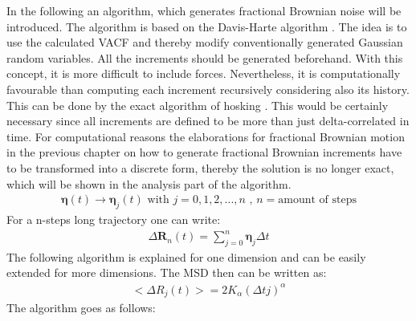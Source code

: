\documentclass[
  a4paper,BCOR10mm,oneside,
  bibtotoc,idxtotoc,
  headsepline,footsepline,%
  fleqn,openbib
]{scrbook}
\begin{document}
In the following an algorithm, which generates fractional Brownian noise will be introduced. The algorithm is based on the Davis-Harte algorithm \cite{Craigmile2003}. The idea is to use the calculated VACF and thereby modify conventionally generated Gaussian random variables. All the increments should be generated beforehand. With this concept, it is more difficult to include forces. Nevertheless, it is computationally favourable than computing each increment recursively considering also its history. This can be done by the exact algorithm of hosking \cite{WRCR:WRCR3676}. This would be certainly necessary since all increments are defined to be more than just delta-correlated in time. For computational reasons the elaborations for fractional Brownian motion in the previous chapter on how to generate fractional Brownian increments have to be transformed into a discrete form, thereby the solution is no longer exact, which will be shown in the analysis part of the algorithm.  
\begin{align}
\bm{\eta} (t) \longrightarrow \bm{\eta}_j(t)  \text{  with  } j=0,1,2,...,n  \text{  ,  } n= \text{amount of steps}
\end{align}
For a n-steps long trajectory one can write:
\begin{align}
 \Delta \bm{R}_n(t) =  \sum_{j=0}^n \bm{\eta}_j  \Delta t \label{eq:diskretdeltar}
\end{align}
 The following algorithm is explained for one dimension and can be easily extended for more dimensions. The MSD then can be written as:
\begin{align}
< \Delta R_{j}(t)>=2K_{\alpha} (\Delta t j)^{\alpha}
\end{align}
The algorithm goes as follows:
\end{document}
